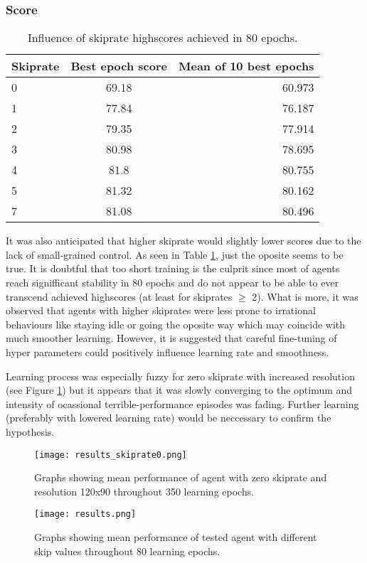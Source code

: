 		\subsubsection*{Score}
			\begin{table}
				\begin{center}
					\begin{tabular}{ |l || c | r |}
						\hline
						Skiprate & Best epoch score & Mean of 10 best epochs \\ \hline
						0 & 69.18 & 60.973 \\ \hline
						1 & 77.84 & 76.187 \\ \hline
						2 & 79.35 & 77.914 \\ \hline
						3 & 80.98 & 78.695 \\ \hline
						4 & 81.8 & 80.755 \\ \hline
						5 & 81.32 & 80.162 \\ \hline
						7 & 81.08 & 80.496 \\ \hline
					\end{tabular}
				\end{center}
				\caption{Influence of skiprate highscores achieved in 80 epochs.}\label{tab:results}
			\end{table}
			It was also anticipated that higher skiprate would slightly lower scores due to the lack of small-grained control. As seen in Table \ref{tab:results}, just the oposite seems to be true. It is doubtful that too short training is the culprit since most of agents reach signifficant stability in 80 epochs and do not appear to be able to ever transcend achieved highscores (at least for skiprates $\geq$ 2). What is more, it was observed that agents with higher skiprates were less prone to irrational behaviours like staying idle or going the oposite way which may coincide with much smoother learning. However, it is suggested that careful fine-tuning of hyper parameters could positively influence learning rate and smoothness. 

			Learning process was especially fuzzy for zero skiprate with increased resolution (see Figure \ref{fig:results_skiprate0}) but it appears that it was slowly converging to the optimum and intensity of ocassional terrible-performance episodes was fading. Further learning (preferably with lowered learning rate) would be neccessary to confirm the hypothesis.
	
	\begin{figure}
		\centering
		\texttt{[image: results\_skiprate0.png]}
		\caption{Graphs showing mean performance of agent with zero skiprate and resolution 120x90 throughout 350 learning epochs.}\label{fig:results_skiprate0}
	\end{figure}

	\begin{figure}
		\centering
		\texttt{[image: results.png]}
		\caption{Graphs showing mean performance of tested agent with different skip values throughout 80 learning epochs.}\label{fig:results}
	\end{figure}
